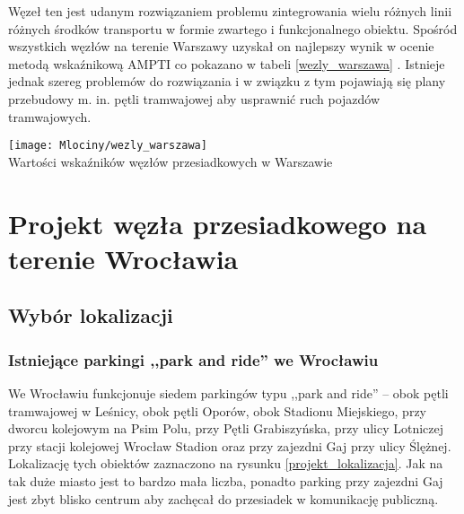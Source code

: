 \documentclass[twoside,12pt]{article}
\begin{document}
	Węzeł ten jest udanym rozwiązaniem problemu zintegrowania wielu różnych linii różnych środków transportu w formie zwartego i funkcjonalnego obiektu. Spośród wszystkich węzłów na terenie Warszawy uzyskał on najlepszy wynik w ocenie metodą wskaźnikową AMPTI co pokazano w tabeli \ref{wezly_warszawa} \cite{metodyka}. Istnieje jednak szereg problemów do rozwiązania i w związku z tym pojawiają się plany przebudowy m. in. pętli tramwajowej aby usprawnić ruch pojazdów tramwajowych. 
	
	\begin{table}[H]
		\centering
		\texttt{[image: Mlociny/wezly\_warszawa]}\\
		\caption{Wartości wskaźników węzłów przesiadkowych w Warszawie}
		\label{wezly_warszawa}
	\end{table}			

\clearpage
\section{Projekt węzła przesiadkowego na terenie Wrocławia}

\subsection{Wybór lokalizacji}

\subsubsection{Istniejące parkingi ,,park and ride'' we Wrocławiu}

	We Wrocławiu funkcjonuje siedem parkingów typu ,,park and ride'' -- obok pętli tramwajowej w Leśnicy, obok pętli Oporów, obok Stadionu Miejskiego, przy dworcu kolejowym na Psim Polu, przy Pętli Grabiszyńska, przy ulicy Lotniczej przy stacji kolejowej Wrocław Stadion oraz przy zajezdni Gaj przy ulicy Ślężnej. Lokalizację tych obiektów zaznaczono na rysunku \ref{projekt_lokalizacja}. Jak na tak duże miasto jest to bardzo mała liczba, ponadto parking przy zajezdni Gaj jest zbyt blisko centrum aby zachęcał do przesiadek w komunikację publiczną.
\end{document}
